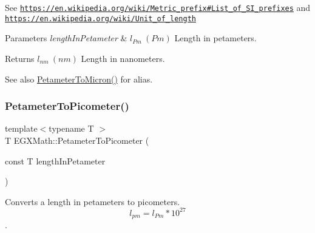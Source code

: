 See \href{https://en.wikipedia.org/wiki/Metric_prefix#List_of_SI_prefixes}{\tt https\+://en.\+wikipedia.\+org/wiki/\+Metric\+\_\+prefix\#\+List\+\_\+of\+\_\+\+S\+I\+\_\+prefixes} and \href{https://en.wikipedia.org/wiki/Unit_of_length}{\tt https\+://en.\+wikipedia.\+org/wiki/\+Unit\+\_\+of\+\_\+length} 
\begin{DoxyParams}{Parameters}
{\em length\+In\+Petameter} & $ l_{Pm}\ (Pm)$ Length in petameters. \\
\hline
\end{DoxyParams}
\begin{DoxyReturn}{Returns}
$ l_{nm}\ (nm)$ Length in nanometers. 
\end{DoxyReturn}
\begin{DoxySeeAlso}{See also}
\mbox{\hyperlink{group___e_g_x_math-_conversions-_length_conversions-_s_i-_petameter-_non-_s_i_gad1c1c26c232339c6304962d20cb29252}{Petameter\+To\+Micron()}} for alias. 
\end{DoxySeeAlso}
\mbox{\label{group___e_g_x_math-_conversions-_length_conversions-_s_i-_petameter-_s_i_ga092df775702bdd1b027e20a243d0aa75}} 
\subsubsection{\texorpdfstring{Petameter\+To\+Picometer()}{PetameterToPicometer()}}
{\footnotesize\ttfamily template$<$typename T $>$ \\
T E\+G\+X\+Math\+::\+Petameter\+To\+Picometer (\begin{DoxyParamCaption}\item[{const T}]{length\+In\+Petameter }\end{DoxyParamCaption})}



Converts a length in petameters to picometers. \[ l_{pm}=l_{Pm} * 10^{27} \]. 

